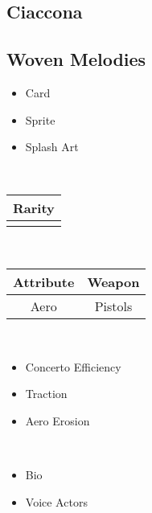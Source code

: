 \documentclass[a4paper,12pt]{article}
\begin{document}
\subsection*{Ciaccona}\n\n\subsection*{Woven Melodies}\n\n\begin{itemize}
\item Card
\item Sprite
\item Splash Art
\end{itemize}\\ \par \vspace{0.5cm}

\begin{tabular}{|c|} \hline
Rarity \\
 \hline
 \\
\end{tabular}\\ \par \vspace{0.5cm}

\begin{tabular}{|c|c|} \hline
Attribute & Weapon \\
 \hline
Aero & Pistols \\
\end{tabular}\\ \par \vspace{0.5cm}

\begin{itemize}
\item Concerto Efficiency
\item Traction
\item Aero Erosion
\end{itemize}\\ \par \vspace{0.5cm}

\begin{itemize}
\item Bio
\item Voice Actors
\end{itemize}\\ \par \vspace{0.5cm}
\end{document}

